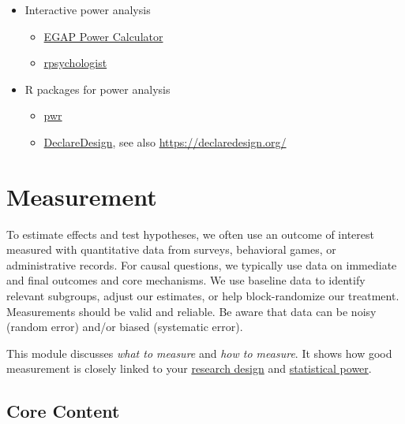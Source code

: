 \documentclass[12pt,]{book}
\begin{document}
\begin{itemize}
\item
  Interactive power analysis

  \begin{itemize}
  \item
    \href{https://egap.shinyapps.io/power-app/}{EGAP Power Calculator}
  \item
    \href{https://rpsychologist.com/d3/NHST/}{rpsychologist}
  \end{itemize}
\item
  R packages for power analysis

  \begin{itemize}
  \item
    \href{https://cran.r-project.org/web/packages/pwr/index.html}{pwr}
  \item
    \href{https://cran.r-project.org/web/packages/DeclareDesign/index.html}{DeclareDesign}, see also \url{https://declaredesign.org/}
  \end{itemize}
\end{itemize}

\hypertarget{measurement}{%
\chapter{Measurement}\label{measurement}}

To estimate effects and test hypotheses, we often use an outcome of interest measured with quantitative data from surveys, behavioral games, or administrative records. For causal questions, we typically use data on immediate and final outcomes and core mechanisms. We use baseline data to identify relevant subgroups, adjust our estimates, or help block-randomize our treatment. Measurements should be valid and reliable. Be aware that data can be noisy (random error) and/or biased (systematic error).

This module discusses \emph{what to measure} and \emph{how to measure}. It shows how good measurement is closely linked to your \href{https://egap.github.io/learningdays-resources/Exercises/design-form.Rmd}{research design} and \href{statistical-power-and-design-diagnosands.html}{statistical power}.

\hypertarget{core-content-6}{%
\section{Core Content}\label{core-content-6}}
\end{document}
